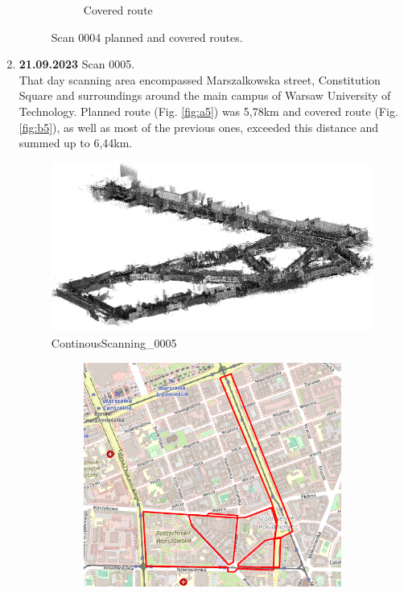 \documentclass[a4paper,12pt]{book}
\begin{document}
\begin{enumerate}
\begin{figure}[H]
\begin{subfigure}{1\textwidth}
		\caption{Covered route}
		\label{fig:b4}
	\end{subfigure}
	\caption{Scan 0004 planned and covered routes.}
	\label{fig:fig4}
\end{figure}
\pagebreak
\item \textbf{21.09.2023} Scan 0005. \\
That day scanning area encompassed Marszalkowska street, Constitution Square and surroundings around the main campus of Warsaw University of Technology. Planned route (Fig. \ref{fig:a5}) was 5,78km and covered route (Fig. \ref{fig:b5}), as well as most of the previous ones, exceeded this distance and summed up to  6,44km. 
\begin{figure}[H]
	\includegraphics[width=1\linewidth]{cloud5}
	\caption{ContinousScanning\_0005}
\end{figure}
\begin{figure}[H]
	\centering
	\begin{subfigure}{.80\textwidth}
		\centering
		\includegraphics[width=1\linewidth]{route_p5}

\end{subfigure}
\end{figure}
\end{enumerate}
\end{document}
